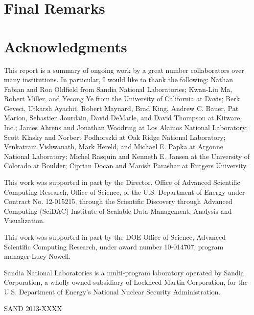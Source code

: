 \documentclass[conference]{IEEEtran}
\begin{document}
\noindent

\section{Final Remarks}
\label{sec:Conclusion}

\noindent

\section*{Acknowledgments}

\noindent
This report is a summary of ongoing work by a great number collaborators
over many institutions.  In particular, I would like to thank the
following: Nathan Fabian and Ron Oldfield from Sandia National
Laboratories; Kwan-Liu Ma, Robert Miller, and Yecong Ye from the University
of California at Davis; Berk Geveci, Utkarsh Ayachit, Robert Maynard, Brad
King, Andrew C. Bauer, Pat Marion, Sebastien Jourdain, David DeMarle, and
David Thompson at Kitware, Inc.; James Ahrens and Jonathan Woodring at Los
Alamos National Laboratory; Scott Klasky and Norbert Podhorszki at Oak
Ridge National Laboratory; Venkatram Vishwanath, Mark Hereld, and Michael
E. Papka at Argonne National Laboratory; Michel Rasquin and Kenneth
E. Jansen at the University of Colorado at Boulder; Ciprian Docan and
Manish Parashar at Rutgers University.


This work was supported in part by the Director, Office of Advanced
Scientific Computing Research, Office of Science, of the U.S. Department of
Energy under Contract No. 12-015215, through the Scientific Discovery
through Advanced Computing (SciDAC) Institute of Scalable Data Management,
Analysis and Visualization.

This work was supported in part by the DOE Office of Science, Advanced
Scientific Computing Research, under award number 10-014707, program
manager Lucy Nowell.

Sandia National Laboratories is a multi-program laboratory operated by
Sandia Corporation, a wholly owned subsidiary of Lockheed Martin
Corporation, for the U.S. Department of Energy's National Nuclear Security
Administration.

\noindent
{\small SAND 2013-XXXX}



\end{document}
